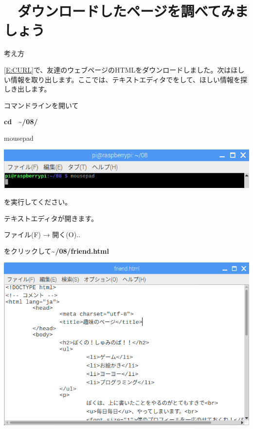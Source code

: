 \clearpage\section{\theExercise　ダウンロードしたページを調べてみましょう}
\addtocounter{Exercise}{-1}\label{E:HTML}
考え方


\ref*{E:CURL}で、友達のウェブページのHTMLをダウンロードしました。次はほしい情報を取り出します。ここでは、テキストエディタでをして、ほしい情報を探しき出します。

コマンドラインを開いて

\textbf{cd \ {\textasciitilde}/08/}

mousepad



\begin{center}
\includegraphics[width=\textwidth]{./text08-img/textbook-img006.png}

\end{center}
を実行してください。

テキストエディタが開きます。

ファイル(F) → 開く(O)..

をクリックして\textbf{{\textasciitilde}/08/friend.html}



\begin{center}
\includegraphics[width=\textwidth]{./text08-img/textbook-img008.png}

\end{center}


